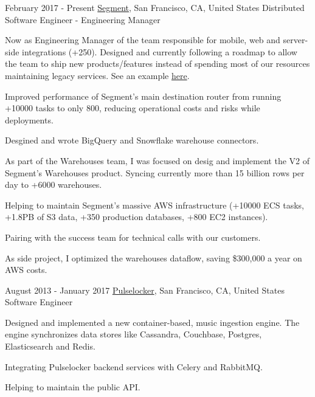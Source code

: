 
\experience
  {February 2017 - Present}
  {\href{https://segment.com}{Segment}, San Francisco, CA, United States}
  {Distributed Software Engineer - Engineering Manager}
  {\vspace{-1em}\begin{rlist}
    \item Now as Engineering Manager of the team responsible for mobile, web and server-side integrations (+250). Designed and
    currently following a roadmap to allow the team to ship new products/features instead of spending most 
    of our resources maintaining legacy services. See an example \href{https://segment.com/blog/unleashing-the-power-of-raw-data-with-amazon-lambda/}{here}.
    \item Improved performance of Segment's main destination router from running +10000 tasks to only 800, reducing operational
    costs and risks while deployments.
    \item Desgined and wrote BigQuery and Snowflake warehouse connectors.
    \item As part of the Warehouses team, I was focused on desig and implement the V2 of Segment's Warehouses 
    product. Syncing currently more than 15 billion rows per day to +6000 warehouses.
    \item Helping to maintain Segment's massive AWS infrastructure (+10000 ECS tasks, +1.8PB of S3 data,
    +350 production databases, +800 EC2 instances).
    \item Pairing with the success team for technical calls with our customers. 
    \item As side project, I optimized the warehouses dataflow, saving \$300,000 a year on AWS costs.
  \end{rlist}}

\experience
  {August 2013 - January 2017}
  {\href{https://djtechtools.com/2018/04/04/beatport-acquires-pulselocker-relaunching-subscription-service-in-q3-2018/}{Pulselocker}, San Francisco, CA, United States}
  {Software Engineer}
  {\vspace{-1em}\begin{rlist}
    \item Designed and implemented a new container-based, music ingestion engine. The engine
    synchronizes data stores like Cassandra, Couchbase, Postgres, Elasticsearch and Redis.
    \item Integrating Pulselocker backend services with Celery and RabbitMQ.
    \item Helping to maintain the public API.
  \end{rlist}}

